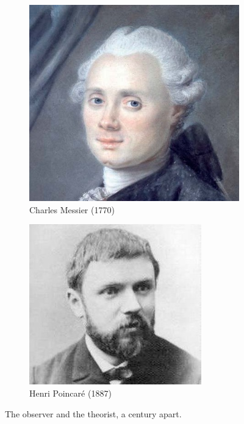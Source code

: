 \begin{figure}
\center
    \centering
    \begin{subfigure}[b]{0.45\textwidth}
    	\centering
    	\includegraphics[width=0.84\linewidth]{Figures/0_messier.jpg}
        \caption{Charles Messier (1770)}
        \label{Fig:0_messier}
    \end{subfigure}
    \begin{subfigure}[b]{0.45\textwidth}
    	\centering
    	\includegraphics[width=0.84\linewidth]{Figures/0_poincare.jpg}
        \caption{Henri Poincar\'e (1887)}
        \label{Fig:0_poincare}
    \end{subfigure}
\caption[Charles Messier and Henri Poincar\'e]{The observer and the theorist, a century apart.}
\label{Fig:0_messierpoincare}
\end{figure}

